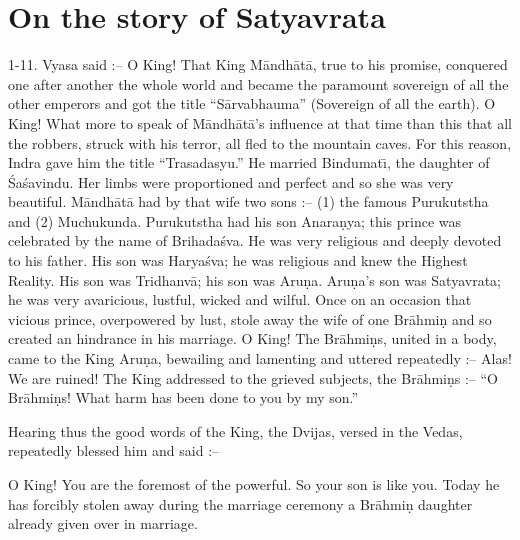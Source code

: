 \chapter{On the story of Satyavrata}

1-11. Vyasa said :-- O King! That King M\=andh\=at\=a, true to his promise, conquered one after another the whole world and became the paramount sovereign of all the other emperors and got the title ``S\=arvabhauma'' (Sovereign of all the earth). O King! What more to speak of M\=andh\=at\=a's influence at that time than this that all the robbers, struck with his terror, all fled to the mountain caves. For this reason, Indra gave him the title ``Trasadasyu.'' He married Bindumat\={\i}, the daughter of \'Sa\'savindu. Her limbs were proportioned and perfect and so she was very beautiful. M\=andh\=at\=a had by that wife two sons :-- (1) the famous Purukutstha and (2) Muchukunda. Purukutstha had his son Anara\d{n}ya; this prince was celebrated by the name of Brihada\'sva. He was very religious and deeply devoted to his father. His son was Harya\'sva; he was religious and knew the Highest Reality. His son was Tridhanv\=a; his son was Aru\d{n}a. Aru\d{n}a's son was Satyavrata; he was very avaricious, lustful, wicked and wilful. Once on an occasion that vicious prince, overpowered by lust, stole away the wife of one Br\=ahmi\d{n} and so created an hindrance in his marriage. O King! The Br\=ahmi\d{n}s, united in a body, came to the King Aru\d{n}a, bewailing and lamenting and uttered repeatedly :-- Alas! We are ruined! The King addressed to the grieved subjects, the Br\=ahmi\d{n}s :-- ``O Br\=ahmi\d{n}s! What harm has been done to you by my son.''

Hearing thus the good words of the King, the Dvijas, versed in the Vedas, repeatedly blessed him and said :--

O King! You are the foremost of the powerful. So your son is like you. Today he has forcibly stolen away during the marriage ceremony a Br\=ahmi\d{n} daughter already given over in marriage.

